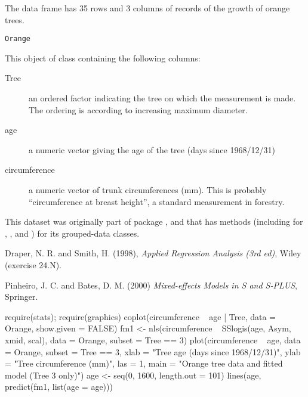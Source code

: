 %
\begin{Description}\relax
The  data frame has 35 rows and 3 columns of records of
the growth of orange trees.
\end{Description}
%
\begin{Usage}
\begin{verbatim}
Orange
\end{verbatim}
\end{Usage}
%
\begin{Format}
This object of class  containing the following columns:
\begin{description}

\item[Tree] 
an ordered factor indicating the tree on which the measurement is
made.  The ordering is according to increasing maximum diameter.

\item[age] 
a numeric vector giving the age of the tree (days since 1968/12/31)

\item[circumference] 
a numeric vector of trunk circumferences (mm).  This is probably
``circumference at breast height'', a standard measurement in
forestry.


\end{description}

\end{Format}
%
\begin{Details}\relax
   
This dataset was originally part of package , and that has
methods (including for \code{[}, ,  and
) for its grouped-data classes. 
\end{Details}
%
\begin{Source}\relax
Draper, N. R. and Smith, H. (1998), \emph{Applied Regression Analysis
(3rd ed)}, Wiley (exercise 24.N).

Pinheiro, J. C. and Bates, D. M. (2000) \emph{Mixed-effects Models
in S and S-PLUS}, Springer.
\end{Source}
%
\begin{Examples}
\begin{ExampleCode}
require(stats); require(graphics)
coplot(circumference ~ age | Tree, data = Orange, show.given = FALSE)
fm1 <- nls(circumference ~ SSlogis(age, Asym, xmid, scal),
           data = Orange, subset = Tree == 3)
plot(circumference ~ age, data = Orange, subset = Tree == 3,
     xlab = "Tree age (days since 1968/12/31)",
     ylab = "Tree circumference (mm)", las = 1,
     main = "Orange tree data and fitted model (Tree 3 only)")
age <- seq(0, 1600, length.out = 101)
lines(age, predict(fm1, list(age = age)))
\end{ExampleCode}
\end{Examples}
